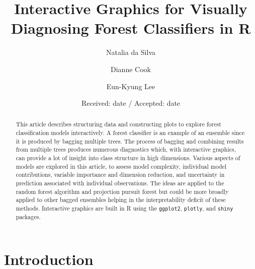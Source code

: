 \documentclass[smallextended,natbib]{svjour3}\usepackage[]{graphicx}\usepackage[]{xcolor}
\begin{document}
\title{Interactive Graphics for Visually Diagnosing Forest Classifiers in R} 


\author{Natalia da Silva \and
        Dianne Cook\and
        Eun-Kyung Lee}




\date{Received: date / Accepted: date}

\maketitle

\begin{abstract}
This article describes structuring data and constructing plots to explore forest classification models interactively. A forest classifier is an example of an ensemble since it is produced by bagging multiple trees. The process of bagging and combining results from multiple trees produces numerous diagnostics which, with interactive graphics, can provide a lot of insight into class structure in high dimensions. Various aspects of models are explored in this article, to assess model complexity, individual model contributions, variable importance and dimension reduction, and uncertainty in prediction associated with individual observations. The ideas are applied to the random forest algorithm and projection pursuit forest but could be more broadly applied to other bagged ensembles helping in the interpretability deficit of these methods. Interactive graphics are built in R using the \texttt{ggplot2}, \texttt{plotly}, and \texttt{shiny} packages.
\end{abstract}

\newpage

\section{Introduction}
\label{sec:intro}
\end{document}
